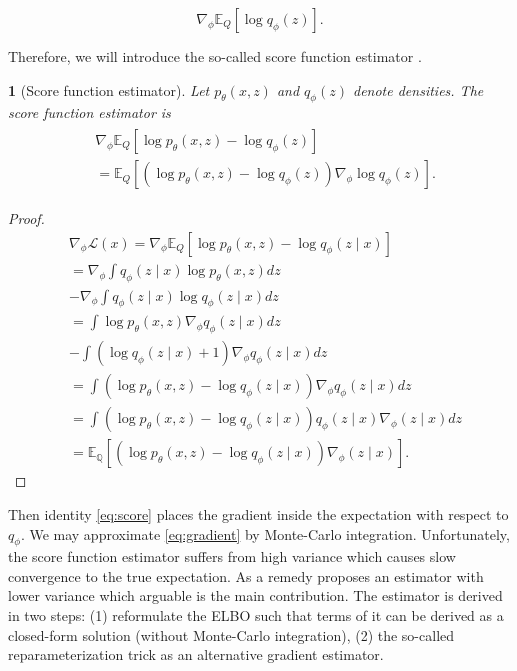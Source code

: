 \documentclass[11pt]{article}
\theoremstyle{plain}
\theoremstyle{definition}
\theoremstyle{plain}
\newtheorem{lem}[thm]{\protect\lemmaname}
\providecommand{\lemmaname}{Lemma}
\begin{document}
\begin{equation}
\nabla_{\phi}\mathbb{E}_{Q}\left[\log q_{\phi}(z)\right].\label{eq:issue_gradient_q}
\end{equation}

\noindent Therefore, we will introduce the so-called score function
estimator \cite{DBLP:journals/corr/MnihG14}.
\begin{lem}[Score function estimator]
Let $p_{\theta}(x,z)$ and $q_{\phi}(z)$ denote densities. The score
function estimator is
\begin{align}
\begin{aligned} & \nabla_{\phi}\mathbb{E}_{Q}\left[\log p_{\theta}(x,z)-\log q_{\phi}(z)\right]\\
 & =\mathbb{E}_{Q}\left[\left(\log p_{\theta}(x,z)-\log q_{\phi}(z)\right)\nabla_{\phi}\log q_{\phi}(z)\right].
\end{aligned}
\label{eq:score}
\end{align}
\end{lem}
\begin{proof}
\begin{equation}
\begin{aligned} & \nabla_{\phi}\mathcal{L}(x)=\nabla_{\phi}\mathbb{E}_{Q}\left[\log p_{\theta}(x,z)-\log q_{\phi}(z\mid x)\right]\\
 & =\nabla_{\phi}\int q_{\phi}(z\mid x)\log p_{\theta}(x,z)dz\\
 & -\nabla_{\phi}\int q_{\phi}(z\mid x)\log q_{\phi}(z\mid x)dz\\
 & =\int\log p_{\theta}(x,z)\nabla_{\phi}q_{\phi}(z\mid x)dz\\
 & -\int(\log q_{\phi}(z\mid x)+1)\nabla_{\phi}q_{\phi}(z\mid x)dz\\
 & =\int\left(\log p_{\theta}(x,z)-\log q_{\phi}(z\mid x)\right)\nabla_{\phi}q_{\phi}(z\mid x)dz\\
 & =\int\left(\log p_{\theta}(x,z)-\log q_{\phi}(z\mid x)\right)q_{\phi}(z\mid x)\nabla_{\phi}(z\mid x)dz\\
 & =\mathbb{E_{Q}}\left[\left(\log p_{\theta}(x,z)-\log q_{\phi}(z\mid x)\right)\nabla_{\phi}(z\mid x)\right].
\end{aligned}
\label{eq:app_proof_score_gradient-1}
\end{equation}
\end{proof}
\noindent Then identity \eqref{eq:score} places the gradient inside
the expectation with respect to $q_{\phi}$. We may approximate \eqref{eq:gradient}
by Monte-Carlo integration. Unfortunately, the score function estimator
suffers from high variance which causes slow convergence to the true
expectation. As a remedy \cite{journals/corr/KingmaW13} proposes
an estimator with lower variance which arguable is the main contribution.
The estimator is derived in two steps: (1) reformulate the ELBO such
that terms of it can be derived as a closed-form solution (without
Monte-Carlo integration), (2) the so-called reparameterization trick
as an alternative gradient estimator.
\end{document}
